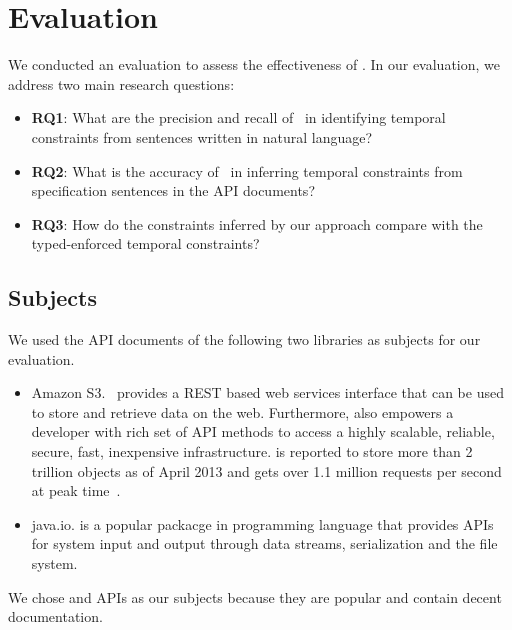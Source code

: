 \section{Evaluation}
\label{sec:evaluation}

We conducted an evaluation to assess the effectiveness of \tool. In our evaluation, we address two main research questions:

\begin{itemize}
	\item\textbf{RQ1}: What are the precision and recall of \tool\  in
	identifying temporal constraints from sentences written in natural language?
	\item\textbf{RQ2}: What is the accuracy of \tool\ in inferring temporal constraints from specification sentences in the API documents?
	\item\textbf{RQ3}: How do the constraints inferred by our approach compare with the typed-enforced temporal constraints?
 
\end{itemize}

\subsection{Subjects}
\label{sub:subject}

We used the API documents of the following two libraries as subjects for our evaluation. 
\begin{itemize}
	\item{Amazon S3}. \amazon\ provides a REST based web services interface that can be used to store and retrieve data on the web. Furthermore,  also empowers a developer with rich set of API methods to access a highly scalable, reliable, secure, fast, inexpensive infrastructure.  is reported to store more than 2 trillion objects as of April 2013 and gets over 1.1 million requests per second at peak time~\cite{amazons3stats}.

	\item{java.io}.  is a popular packacge in  programming language that provides APIs for system input and output through data streams, serialization and the file system.
\end{itemize}
We chose  and  APIs as our subjects because they are popular and contain decent documentation.

